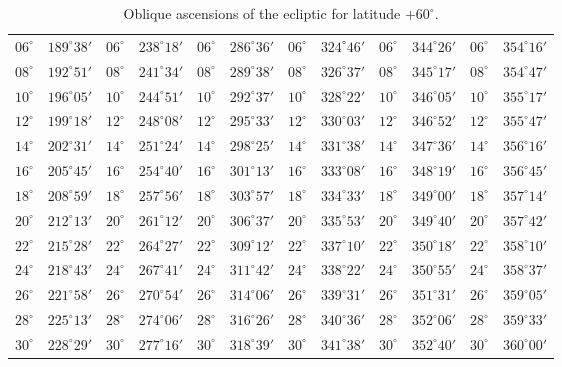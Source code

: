 \begin{table}[!h]
{\begin{tabular}{cc|cc|cc|cc|cc|cc}
$06^\circ$ & $189^\circ38'$ & $06^\circ$ & $238^\circ18'$ & $06^\circ$ & $286^\circ36'$ & $06^\circ$ & $324^\circ46'$ &  $06^\circ$ & $344^\circ26'$ & $06^\circ$ & $354^\circ16'$\\
$08^\circ$ & $192^\circ51'$ & $08^\circ$ & $241^\circ34'$ & $08^\circ$ & $289^\circ38'$ & $08^\circ$ & $326^\circ37'$ &  $08^\circ$ & $345^\circ17'$ & $08^\circ$ & $354^\circ47'$\\
$10^\circ$ & $196^\circ05'$ & $10^\circ$ & $244^\circ51'$ & $10^\circ$ & $292^\circ37'$ & $10^\circ$ & $328^\circ22'$ &  $10^\circ$ & $346^\circ05'$ & $10^\circ$ & $355^\circ17'$\\
$12^\circ$ & $199^\circ18'$ & $12^\circ$ & $248^\circ08'$ & $12^\circ$ & $295^\circ33'$ & $12^\circ$ & $330^\circ03'$ &  $12^\circ$ & $346^\circ52'$ & $12^\circ$ & $355^\circ47'$\\
$14^\circ$ & $202^\circ31'$ & $14^\circ$ & $251^\circ24'$ & $14^\circ$ & $298^\circ25'$ & $14^\circ$ & $331^\circ38'$ &  $14^\circ$ & $347^\circ36'$ & $14^\circ$ & $356^\circ16'$\\
$16^\circ$ & $205^\circ45'$ & $16^\circ$ & $254^\circ40'$ & $16^\circ$ & $301^\circ13'$ & $16^\circ$ & $333^\circ08'$ &  $16^\circ$ & $348^\circ19'$ & $16^\circ$ & $356^\circ45'$\\
$18^\circ$ & $208^\circ59'$ & $18^\circ$ & $257^\circ56'$ & $18^\circ$ & $303^\circ57'$ & $18^\circ$ & $334^\circ33'$ &  $18^\circ$ & $349^\circ00'$ & $18^\circ$ & $357^\circ14'$\\
$20^\circ$ & $212^\circ13'$ & $20^\circ$ & $261^\circ12'$ & $20^\circ$ & $306^\circ37'$ & $20^\circ$ & $335^\circ53'$ &  $20^\circ$ & $349^\circ40'$ & $20^\circ$ & $357^\circ42'$\\
$22^\circ$ & $215^\circ28'$ & $22^\circ$ & $264^\circ27'$ & $22^\circ$ & $309^\circ12'$ & $22^\circ$ & $337^\circ10'$ &  $22^\circ$ & $350^\circ18'$ & $22^\circ$ & $358^\circ10'$\\
$24^\circ$ & $218^\circ43'$ & $24^\circ$ & $267^\circ41'$ & $24^\circ$ & $311^\circ42'$ & $24^\circ$ & $338^\circ22'$ &  $24^\circ$ & $350^\circ55'$ & $24^\circ$ & $358^\circ37'$\\
$26^\circ$ & $221^\circ58'$ & $26^\circ$ & $270^\circ54'$ & $26^\circ$ & $314^\circ06'$ & $26^\circ$ & $339^\circ31'$ &  $26^\circ$ & $351^\circ31'$ & $26^\circ$ & $359^\circ05'$\\
$28^\circ$ & $225^\circ13'$ & $28^\circ$ & $274^\circ06'$ & $28^\circ$ & $316^\circ26'$ & $28^\circ$ & $340^\circ36'$ &  $28^\circ$ & $352^\circ06'$ & $28^\circ$ & $359^\circ33'$\\
$30^\circ$ & $228^\circ29'$ & $30^\circ$ & $277^\circ16'$ & $30^\circ$ & $318^\circ39'$ & $30^\circ$ & $341^\circ38'$ &  $30^\circ$ & $352^\circ40'$ & $30^\circ$ & $360^\circ00'$\\
\end{tabular}}
\caption{Oblique ascensions of the ecliptic for latitude $+60^\circ$.}\label{trr}
\end{table}

